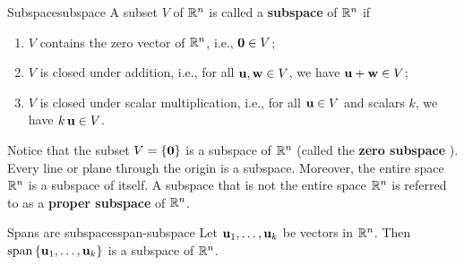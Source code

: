 \begin{definition}{Subspace}{subspace}
  A subset $V$ of\/ $\mathbb{R}^n$ is called a \textbf{subspace}%
  of\/ $\mathbb{R}^n$ if
  \begin{enumerate}
  \item $V$ contains the zero vector of\/ $\mathbb{R}^n$, i.e., $\vect{0}\in V$;
  \item $V$ is closed under addition, i.e., for all\/
    $\vect{u},\vect{w}\in V$, we have $\vect{u}+\vect{w}\in V$;
  \item $V$ is closed under scalar multiplication, i.e., for all\/
    $\vect{u}\in V$ and scalars $k$, we have\/ $k\,\vect{u}\in V$.
  \end{enumerate}
\end{definition}

Notice that the subset $V = \set{\vect{0}}$ is a subspace of\/ $\mathbb{R}^n$
(called the \textbf{zero subspace}%
%
). Every line or plane through the
origin is a subspace. Moreover, the entire space $\mathbb{R}^n$ is a subspace
of itself. A subspace that is not the entire space $\mathbb{R}^n$ is referred
to as a \textbf{proper subspace}%
%
 of\/ $\mathbb{R}^n$.

\begin{proposition}{Spans are subspaces}{span-subspace}
  Let $\vect{u}_1,\ldots,\vect{u}_k$ be vectors in $\mathbb{R}^n$. Then
  $\sspan\set{\vect{u}_1,\ldots,\vect{u}_k}$ is a subspace of
  $\mathbb{R}^n$.%
\end{proposition}

